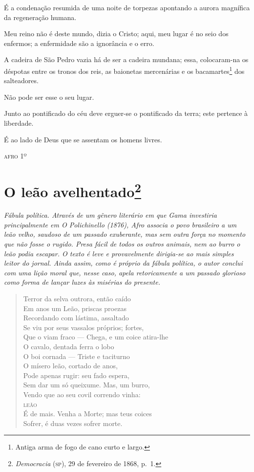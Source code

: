 É a condenação resumida de uma noite de torpezas apontando a aurora
magnífica da regeneração humana.

Meu reino não é deste mundo, dizia o Cristo; aqui, meu lugar é no seio
dos enfermos; a enfermidade são a ignorância e o erro.

A cadeira de São Pedro vazia há de ser a cadeira mundana; essa,
colocaram-na os déspotas entre os tronos dos reis, as baionetas
mercenárias e os bacamartes\footnote{Antiga arma de fogo de cano curto
  e largo.} dos salteadores.

Não pode ser esse o seu lugar.

Junto ao pontificado do céu deve erguer-se o pontificado da terra; este
pertence à liberdade.

É ao lado de Deus que se assentam os homens livres.

\begin{flushright}
\textsc{afro} 1º
\end{flushright}

\chapter{O leão avelhentado\footnote{\emph{Democracia} (\textsc{sp}),
  29 de fevereiro de 1868, p.~1.}}

\begin{didascalia}\itshape
Fábula política. Através de um gênero literário em que Gama investiria
principalmente em \textnormal{O Polichinello} (1876), Afro associa o
povo brasileiro a um leão velho, saudoso de um passado exuberante, mas
sem outra força no momento que não fosse o rugido. Presa fácil de todos
os outros animais, nem ao burro o leão podia escapar. O texto é leve e
provavelmente dirigia-se ao mais simples leitor do jornal. Ainda assim,
como é próprio da fábula política, o autor conclui com uma lição moral
que, nesse caso, apela retoricamente a um passado glorioso como forma de
lançar luzes às misérias do presente.
\end{didascalia}


\begin{verse}
Terror da selva outrora, então caído\\
Em anos um Leão, priscas proezas\\
Recordando com lástima, assaltado\\
Se viu por seus vassalos próprios; fortes,\\
Que o viam fraco --- Chega, e um coice atira-lhe\\
O cavalo, dentada ferra o lobo\\
O boi cornada --- Triste e taciturno\\
O mísero leão, cortado de anos,\\
Pode apenas rugir: seu fado espera,\\
Sem dar um só queixume. Mas, um burro,\\
Vendo que ao seu covil correndo vinha:\\
\textsc{leão}\\
É de mais. Venha a Morte; mas teus coices\\
Sofrer, é duas vezes sofrer morte.
\end{verse}

